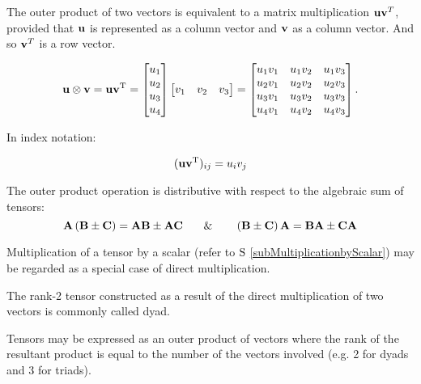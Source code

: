  
 \begin{exa}
  The outer product of two vectors is equivalent to a matrix multiplication
$\vector{uv}^T$, provided that $\vector{u}$ is represented
as a column vector and $\vector{v}$ as a column
vector. And so $\vector{v}^T$ is a row
vector.

\begin{align}\vector{u} \otimes \vector{v} = \vector{u} \vector{v}^\mathrm{T}
= \begin{bmatrix}u_1 \\ u_2 \\ u_3 \\ u_4\end{bmatrix}
\begin{bmatrix}v_1 & v_2 & v_3\end{bmatrix}
= \begin{bmatrix}u_1v_1 & u_1v_2 & u_1v_3 \\ u_2v_1 & u_2v_2 & u_2v_3 \\ u_3v_1 & u_3v_2 & u_3v_3 \\ u_4v_1 & u_4v_2 & u_4v_3\end{bmatrix}.\end{align}

In index notation:

\[(\vector{u} \vector{v}^\mathrm{T})_{ij}=u_iv_j\]

 \end{exa}

 
 
 The outer product operation is distributive with respect
to the algebraic sum of tensors:
\begin{equation}
\vector{A}\left(\vector{B}\pm\vector{C}\right)=\vector{A}\vector{B}\pm\vector{A}\vector{C}\,\,\,\,\,\,\,\,\,\,\,\&\,\,\,\,\,\,\,\,\,\,\,\,\left(\vector{B}\pm\vector{C}\right)\vector{A}=\vector{B}\vector{A}\pm\vector{C\vector{A}}
\end{equation}


 Multiplication of a tensor by a scalar (refer to $\S$
\ref{subMultiplicationbyScalar}) may be regarded as a special case
of direct multiplication.

 The rank-2 tensor constructed as a result of the direct
multiplication of two vectors is commonly called dyad.

 Tensors may be expressed as an outer product of vectors
where the rank of the resultant product is equal to the number of
the vectors involved (e.g. 2 for dyads and 3 for triads).

